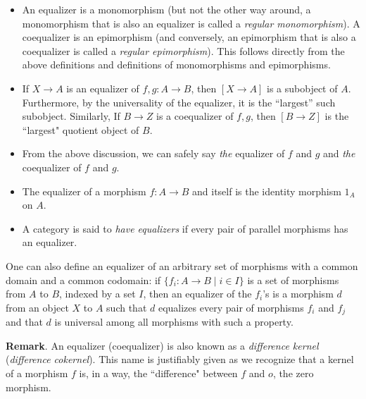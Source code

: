 \documentclass[12pt]{article}
\begin{document}
\begin{itemize}
\item An equalizer is a monomorphism (but not the other way around, a monomorphism that is also an equalizer is called a \emph{regular monomorphism}). A coequalizer is an epimorphism (and conversely, an epimorphism that is also a coequalizer is called a \emph{regular epimorphism}).  This follows directly from the above definitions and definitions of monomorphisms and epimorphisms.
\item If $X\to A$ is an equalizer of $f,g\colon A\to B$, then $[X\to A]$ is a subobject of $A$.  Furthermore, by the universality of the equalizer, it is the ``largest'' such subobject.  Similarly, If $B\to Z$ is a coequalizer of $f,g$, then $[B\to Z]$ is the ``largest" quotient object of $B$.
\item From the above discussion, we can safely say \emph{the} equalizer of $f$ and $g$ and \emph{the} coequalizer of $f$ and $g$.
\item The equalizer of a morphism $f:A\to B$ and itself is the identity morphism $1_A$ on $A$.
\item A category is said to \emph{have equalizers} if every pair of parallel morphisms has an equalizer.
\end{itemize}

One can also define an equalizer of an arbitrary set of morphisms with a common domain and a common codomain:  if $\lbrace f_i:A\to B\mid i\in I\rbrace$ is a set of morphisms from $A$ to $B$, indexed by a set $I$, then an equalizer of the $f_i$'s is a morphism $d$ from an object $X$ to $A$ such that $d$ equalizes every pair of morphisms $f_i$ and $f_j$ and that $d$ is universal among all morphisms with such a property.

\textbf{Remark}.  An equalizer (coequalizer) is also known as a \emph{difference kernel} (\emph{difference cokernel}).  This name is justifiably given as we recognize that a kernel of a morphism $f$ is, in a way, the ``difference" between $f$ and $o$, the zero morphism.
\end{document}
